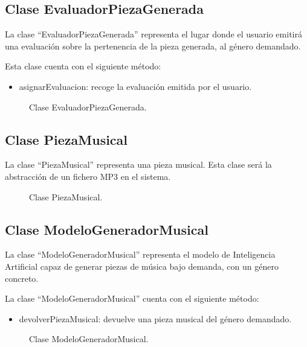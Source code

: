 \subsection{Clase EvaluadorPiezaGenerada}

La clase ``EvaluadorPiezaGenerada'' representa el lugar donde el usuario emitirá una evaluación sobre la pertenencia de la pieza generada, al género demandado.

Esta clase cuenta con el siguiente método:

\begin{itemize}
    \item asignarEvaluacion: recoge la evaluación emitida por el usuario.
\end{itemize}

\begin{figure}[H]
  \centering
  
  \caption{Clase EvaluadorPiezaGenerada.}
\end{figure}

\subsection{Clase PiezaMusical}

La clase ``PiezaMusical'' representa una pieza musical. Esta clase será la abstracción de un fichero MP3 en el sistema.

\begin{figure}[H]
  \centering
  
  \caption{Clase PiezaMusical.}
\end{figure}

\subsection{Clase ModeloGeneradorMusical}

La clase ``ModeloGeneradorMusical'' representa el modelo de Inteligencia Artificial capaz de generar piezas de música bajo demanda, con un género concreto.

La clase ``ModeloGeneradorMusical'' cuenta con el siguiente método:

\begin{itemize}
    \item devolverPiezaMusical: devuelve una pieza musical del género demandado.
\end{itemize}

\begin{figure}[H]
  \centering
  
  \caption{Clase ModeloGeneradorMusical.}
\end{figure}

